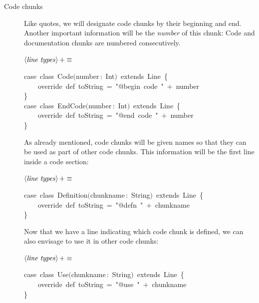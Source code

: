 \documentclass[a4paper,12pt]{article}
\begin{document}
\begin{description}
\item[Code chunks] Like quotes, we will designate code chunks by their
beginning and end. Another important information will be the \emph{number} of
this chunk: Code and documentation chunks are numbered consecutively.

$\left<\mbox{\emph{line types}}\right>+\equiv$
\begin{program}{\vem case}~{\vem class}~Code$($number\,{\rm :}~Int$)$~{\vem extends}~Line~{\small\{}
\\~~~~{\vem override}~{\vem def}~toString~=~"@begin~code~"~$+$~number
\\{\small\}}
\\{\vem case}~{\vem class}~EndCode$($number\,{\rm :}~Int$)$~{\vem extends}~Line~{\small\{}
\\~~~~{\vem override}~{\vem def}~toString~=~"@end~code~"~$+$~number
\\{\small\}}
\\[0.5em]\end{program}



As already mentioned, code chunks will be given names so that they
can be used as part of other code chunks. This information will be the
first line inside a code section:

$\left<\mbox{\emph{line types}}\right>+\equiv$
\begin{program}{\vem case}~{\vem class}~Definition$($chunkname\,{\rm :}~String$)$~{\vem extends}~Line~{\small\{}
\\~~~~{\vem override}~{\vem def}~toString~=~"@defn~"~$+$~chunkname
\\{\small\}}
\\[0.5em]\end{program}



Now that we have a line indicating which code chunk is defined, we can
also envisage to use it in other code chunks:

$\left<\mbox{\emph{line types}}\right>+\equiv$
\begin{program}{\vem case}~{\vem class}~Use$($chunkname\,{\rm :}~String$)$~{\vem extends}~Line~{\small\{}
\\~~~~{\vem override}~{\vem def}~toString~=~"@use~"~$+$~chunkname
\\{\small\}}
\\[0.5em]\end{program}




\end{description}
\end{document}
